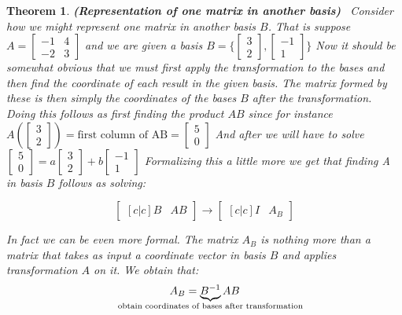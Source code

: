 \documentclass[titlepage]{article}
\newtheorem{thm}{Theorem}[subsection]
\numberwithin{equation}{subsection}
\begin{document}
\begin{thm}\textbf{(Representation of one matrix in another basis)}
\
Consider how we might represent one matrix in another basis $B$. That is suppose $A = \begin{bmatrix}
    -1 & 4 \\
    -2 & 3
\end{bmatrix}$ and we are given a basis $B = \{ \begin{bmatrix}
    3 \\
    2
\end{bmatrix}, \begin{bmatrix}
    -1 \\ 
    1
\end{bmatrix} \}$ Now it should be somewhat obvious that we must first apply the transformation to the bases and then find the coordinate of each result in the given basis. The matrix formed by these is then simply the coordinates of the bases $B$ after the transformation. Doing this follows as first finding the product $AB$ since for instance $A(\begin{bmatrix}
    3 \\
    2
\end{bmatrix}) = \text{first column of AB} = \begin{bmatrix}
    5 \\ 
    0
\end{bmatrix}$ And after we will have to solve $\begin{bmatrix}
    5 \\
    0
\end{bmatrix} = a \begin{bmatrix}
    3 \\ 
    2
\end{bmatrix} + b\begin{bmatrix}
    -1 \\ 
    1
\end{bmatrix}$ Formalizing this a little more we get that finding A in basis $B$ follows as solving:

$$\begin{bmatrix}[c|c]
    B & AB
\end{bmatrix} \rightarrow \begin{bmatrix}[c|c]
    I & A_{B}
\end{bmatrix}$$

In fact we can be even more formal. The matrix $A_B$ is nothing more than a matrix that takes as input a coordinate vector in basis $B$ and applies transformation $A$ on it. We obtain that:
$$A_{B} = \underbrace{B^{-1}}_{\text{\makebox[0pt]{obtain coordinates of bases after transformation}}}AB$$
\end{thm}
\end{document}
